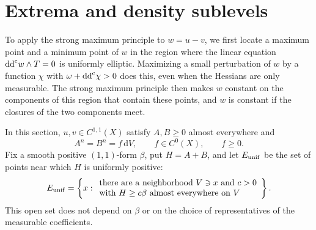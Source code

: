 \section{Extrema and density sublevels}
\label{uni-sec:anchors}

To apply the strong maximum principle to $w=u-v$, we first locate a maximum point and a minimum point of $w$ in the region where the linear equation $\mathrm{dd}^{\mathrm{c}} w\wedge T=0$ is uniformly elliptic. Maximizing a small perturbation of $w$ by a function $\chi$ with $\omega+\mathrm{dd}^{\mathrm{c}}\chi>0$ does this, even when the Hessians are only measurable. The strong maximum principle then makes $w$ constant on the components of this region that contain these points, and $w$ is constant if the closures of the two components meet.

In this section, $u,v\in C^{1,1}(X)$ satisfy $A,B\geq0$ almost everywhere and
\begin{equation}
  A^n=B^n=f\,\mathrm{d}V,\qquad f\in C^0(X),\qquad f\geq0.
  \label{uni-eq:density}
\end{equation}
Fix a smooth positive $(1,1)$-form $\beta$, put $H=A+B$, and let $E_{\rm unif}$ be the set of points near which $H$ is uniformly positive:
\begin{equation}
 E_{\rm unif}
 =\left\{x:\begin{array}{l}
 \text{there are a neighborhood }V\ni x\text{ and }c>0\\
 \text{with }H\geq c\beta\text{ almost everywhere on }V
 \end{array}\right\}.
 \label{uni-eq:Eunif}
\end{equation}
This open set does not depend on $\beta$ or on the choice of representatives of the
measurable coefficients.


